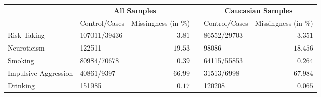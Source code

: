 \begin{tabular}{llrclr}
\hline\hline
\multicolumn{1}{l}{\bfseries }&\multicolumn{2}{c}{\bfseries All Samples}&\multicolumn{1}{c}{\bfseries }&\multicolumn{2}{c}{\bfseries Caucasian Samples}\tabularnewline
\cline{2-3} \cline{5-6}
\multicolumn{1}{l}{}&\multicolumn{1}{c}{Control/Cases}&\multicolumn{1}{c}{Missingness (in \%)}&\multicolumn{1}{c}{}&\multicolumn{1}{c}{Control/Cases}&\multicolumn{1}{c}{Missingness (in \%)}\tabularnewline
\hline
Risk Taking&107011/39436&$ 3.81$&&86552/29703&$ 3.351$\tabularnewline
Neuroticism&122511&$19.53$&&98086&$18.456$\tabularnewline
Smoking&80984/70678&$ 0.39$&&64115/55853&$ 0.264$\tabularnewline
Impulsive Aggression&40861/9397&$66.99$&&31513/6998&$67.984$\tabularnewline
Drinking&151985&$ 0.17$&&120208&$ 0.065$\tabularnewline
\hline
\end{tabular}
